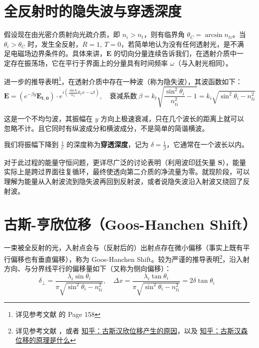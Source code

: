\documentclass[UTF8]{report}
\theoremstyle{MyLineTheoremStyle} %
\theoremstyle{MyBlockTheoremStyle} %
\theoremstyle{MySubsubsectionStyle} %
\begin{document}




\section{全反射时的隐失波与穿透深度}

假设现在由光密介质射向光疏介质，即 $n_i > n_t$，则有临界角 $\theta_C = \arcsin n_{ti}$。当 $\theta_i > \theta_C$ 时，发生全反射，$R = 1,\ T = 0$，若简单地认为没有任何透射光，是不满足电磁场边界条件的。具体来讲，$\boldsymbol{E}$ 的切向分量连续告诉我们，在透射介质中一定存在振荡场，它在平行于界面上的分量具有时间频率 $\omega$（与入射光相同）。

进一步的推导表明\footnote{详见参考文献 \cite{Optics} 的 Page 158}，在透射介质中存在一种波（称为隐失波），其波函数如下：
\begin{equation}
\boldsymbol{E} = \left( e^{-\beta y} \boldsymbol{E_{t,0}}\right)\cdot e^{i\left( \frac{\sin \theta_i}{n_{ti}}  k_t x - \omega t \right)},\quad \text{衰减系数}\  \beta = k_t \sqrt{\frac{\sin^2 \theta_i}{n_{ti}^2} - 1} = k_i\sqrt{\sin^2 \theta_i - n_{ti}^2} 
\end{equation}

这是一个不均匀波，其振幅在 $y$ 方向上极速衰减，只在几个波长的距离上就可以忽略不计。且它同时有纵波成分和横波成分，不是简单的简谐横波。

我们将振幅下降到 $\frac{1}{e}$ 的深度称为\textbf{穿透深度}，记为 $\delta = \frac{1}{\beta} $，它通常在一个波长以内。

对于此过程的能量守恒问题，更详尽广泛的讨论表明（利用波印廷矢量 $\boldsymbol{S}$），能量实际上是跨过界面往复循环，最终使透向第二介质的净流量为零。就现阶段，可以理解为能量从入射波流到隐失波再回到反射波，或者说隐失波沿入射波又绕回了反射波。

\section{古斯-亨欣位移（Goos-Hanchen Shift）}

一束被全反射的光，入射点会与（反射后的）出射点存在微小偏移（事实上既有平行偏移也有垂直偏移），称为 Goos-Hanchen Shift。较为严谨的推导表明\footnote{详见参考文献 \cite{GHShift}，或者 \href{https://www.zhihu.com/question/446676895/answer/3407740051}{知乎：古斯汉欣位移产生的原因}，以及 \href{https://www.zhihu.com/question/620522351/answer/3209865128}{知乎：古斯汉森位移的原理是什么}}，沿入射方向、与分界线平行的偏移量如下（又称为侧向偏移）：
\begin{equation}
\delta_{\perp} = \frac{\lambda_i \sin \theta_i}{\pi \sqrt{\sin^2 \theta_i - n_{ti}^2} },\quad \Delta x =  \frac{\lambda_i \tan \theta_i}{\pi \sqrt{\sin^2 \theta_i - n_{ti}^2} } = 2 \delta \tan \theta_i 
\end{equation}
\end{document}
